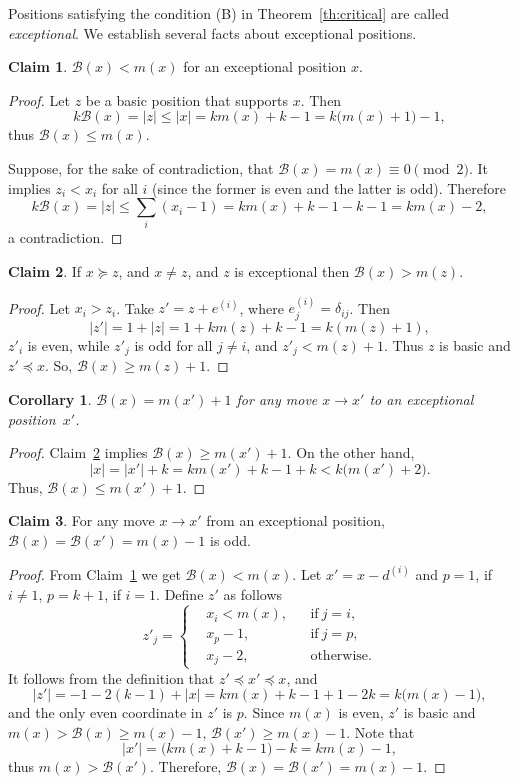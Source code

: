 \documentclass{article}
\newtheorem{corollary}{Corollary}
\theoremstyle{definition}
\newtheorem{claim}{Claim}
\def\mv#1{d^{(#1)}}
\def\B{\mathcal{B}}
\begin{document}
Positions satisfying the condition (B) in Theorem~\ref{th:critical} are called \emph{exceptional}. We establish several facts about exceptional positions.

\begin{claim}\label{exceptional0}
  $\B(x)<m(x)$ for an exceptional position $x$.
\end{claim}
\begin{proof}
  Let $z$ be a basic position that supports $x$. Then
\[
k\B(x) = |z| \leq |x| = km(x) +k-1 = k\big(m(x)+1\big) -1,
\]
thus $\B(x)\leq m(x)$.

Suppose, for the sake of contradiction, that $\B(x)=m(x)\equiv0\pmod2$. It implies $z_i< x_i$ for  all $i$ (since the former is even and the latter is odd). Therefore
\[
k\B(x) = |z|\leq \sum_{i} (x_i-1) = km(x) +k-1 -k-1= km(x) -2,
\]
a contradiction.
\end{proof}

\begin{claim}\label{exceptional1}
  If $x\succeq z$, and $x\ne z$, and $z$ is exceptional then $\B(x)> m(z)$.
\end{claim}
\begin{proof}
  Let $x_i>z_i$. Take $z' = z+e^{(i)}$, where $e^{(i)}_j = \delta_{ij}$. Then
\[
|z'|= 1+| z| = 1+ km(z) +k-1 = k(m(z)+1),
\]
$z'_i$ is even, while $z'_j$ is odd for all $j\ne i$,  and $z'_j<m(z)+1$. Thus $z$ is basic and $z'\preceq x$. So, $\B(x)\geq m(z)+1$.
\end{proof}

\begin{corollary}\label{exeptional2}
$\B(x)= m(x')+1$  for any move $x\to x'$ to an exceptional position~$x'$.
\end{corollary}

\begin{proof}
   Claim~\ref{exceptional1} implies $\B(x)\geq m(x')+1$. On the other hand,
  \[
  |x|=|x'|+k =  km(x')+k-1 +k < k\big(m(x')+2\big).
  \]
  Thus, $\B(x)\leq m(x')+1$.
\end{proof}

\begin{claim}\label{exceptional3}
  For any move $x\to x'$ from an exceptional position, $\B(x)=\B(x')=m(x)-1$  is odd. 
\end{claim}

\begin{proof}
  From Claim~\ref{exceptional0} we get $\B(x)<m(x)$. 
Let $x' = x-\mv{i}$ and $p=1$, if $i\ne 1$, $p=k+1$, if $i=1$. Define $z'$   as follows
\[
z'_j = \left\{\begin{aligned}
  &x_i <m(x), &&\text{if}\ j=i,\\
&x_p-1, &&\text{if}\ j=p,\\
&x_j-2, &&\text{otherwise.}
\end{aligned}\right.
\]
It follows from the definition that $z'\preceq x'\preceq x$, and
\[
| z'| = -1-2(k-1) +|x |= km(x) +k-1 +1 -2k = k\big(m(x)-1\big),
\]
and the only even coordinate in $z'$ is $p$. Since $m(x)$ is even, $z'$ is basic and $m(x) > \B(x)\geq m(x)-1$, $\B(x')\geq m(x)-1$. Note that 
\[
|x'|=\big(km(x) +k-1\big)-k = km(x)-1,
\]
thus $m(x)> \B(x')$.
Therefore, $\B(x) =\B(x') = m(x)-1 $.
\end{proof}
\end{document}

